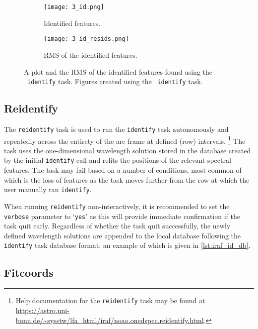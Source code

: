 \begin{figure}
    \centering
    \begin{subfigure}[b]{0.49\textwidth}
        \centering
        \texttt{[image: 3\_id.png]}
        \caption{Identified features.}
    \end{subfigure}
    \hfill
    \begin{subfigure}[b]{0.49\textwidth}
        \centering
        \texttt{[image: 3\_id\_resids.png]}
        \caption{\gls{RMS} of the identified features.}
    \end{subfigure}
    \caption{A plot and the \gls{RMS} of the identified features found using the \iraf\ \texttt{identify} task. Figures created using the \iraf\ \texttt{identify} task.}
    \label{fig:iraf_id_plot}
\end{figure}

\subsection{Reidentify} \label{subsec:iraf_reidentify}

The \texttt{reidentify} task is used to run the \texttt{identify} task autonomously and repeatedly across the entirety of the arc frame at defined (row) intervals.%
\footnote{Help documentation for the \texttt{reidentify} task may be found at \url{https://astro.uni-bonn.de/~sysstw/lfa_html/iraf/noao.onedspec.reidentify.html}.}
The task uses the one-dimensional wavelength solution stored in the database created by the initial \texttt{identify} call and refits the positions of the relevant spectral features. The task may fail based on a number of conditions, most common of which is the loss of features as the task moves further from the row at which the user manually ran \texttt{identify}.

\pagebreak

When running \texttt{reidentify} non-interactively, it is recommended to set the \texttt{verbose} parameter to `\texttt{yes}' as this will provide immediate confirmation if the task quit early. Regardless of whether the task quit successfully, the newly defined wavelength solutions are appended to the local database following the \texttt{identify} task database format, an example of which is given in \autoref{lst:iraf_id_db}.

\subsection{Fitcoords} \label{subsec:iraf_fitcoords}

